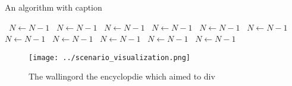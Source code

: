 \documentclass[a4paper]{article}
\begin{document}
\begin{algorithm}
\caption{An algorithm with caption}
\begin{algorithmic}
\    \State $N \gets N - 1$
\    \State $N \gets N - 1$
\    \State $N \gets N - 1$
\    \State $N \gets N - 1$
\    \State $N \gets N - 1$
\    \State $N \gets N - 1$
\    \State $N \gets N - 1$
\    \State $N \gets N - 1$
\    \State $N \gets N - 1$
\    \State $N \gets N - 1$
\    \State $N \gets N - 1$
\EndWhile
\end{algorithmic}
\end{algorithm}

\begin{figure}
\centering
\texttt{[image: ../scenario\_visualization.png]}
\caption{The wallingord the encyclopdie which aimed to div
}
\end{figure}
 
\end{document}
